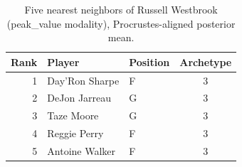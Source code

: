 \begin{table}[htbp]
  \centering\small
  \begin{tabular}{rllc}
    \toprule
    Rank & Player & Position & Archetype \\
    \midrule
    1 & Day'Ron Sharpe & F & 3 \\
    2 & DeJon Jarreau & G & 3 \\
    3 & Taze Moore & G & 3 \\
    4 & Reggie Perry & F & 3 \\
    5 & Antoine Walker & F & 3 \\
    \bottomrule
  \end{tabular}
  \caption{Five nearest neighbors of Russell Westbrook (peak_value modality), Procrustes-aligned posterior mean.}
  \label{tab:Russell_Westbrook_neighbors_peak_value}
\end{table}

